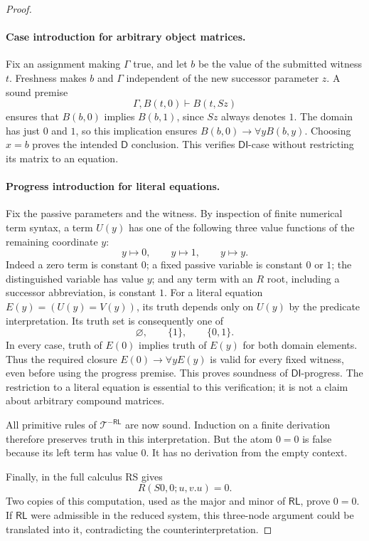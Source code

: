 \documentclass[11pt,letterpaper]{article}
\theoremstyle{definition}\newtheorem{definition}[theorem]{Definition}
\theoremstyle{remark}\newtheorem{remark}[theorem]{Remark}
\begin{document}
\begin{proof}
\paragraph{Case introduction for arbitrary object matrices.}
Fix an assignment making $\Gamma$ true, and let $b$ be the value of
the submitted witness $t$. Freshness makes $b$ and $\Gamma$
independent of the new successor parameter $z$. A sound premise
\[
        \Gamma,B(t,0)\vdash B(t,Sz)
\]
ensures that $B(b,0)$ implies $B(b,1)$, since $Sz$ always denotes
$1$. The domain has just $0$ and $1$, so this implication ensures
$B(b,0)\to\forall yB(b,y)$. Choosing $x=b$ proves the intended
$\mathsf D$ conclusion. This verifies $\mathsf{DI}$-case without
restricting its matrix to an equation.

\paragraph{Progress introduction for literal equations.}
Fix the passive parameters and the witness. By inspection of finite
numerical term syntax, a term $U(y)$ has one of the following three
value functions of the remaining coordinate $y$:
\[
                y\longmapsto0,\qquad
                y\longmapsto1,\qquad
                y\longmapsto y.
\]
Indeed a zero term is constant $0$; a fixed passive variable is constant
$0$ or $1$; the distinguished variable has value $y$; and any term
with an $R$ root, including a successor abbreviation, is constant $1$.
For a literal equation $E(y)=(U(y)=V(y))$, its truth depends only on
$U(y)$ by the predicate interpretation. Its truth set is consequently
one of
\[
                       \varnothing,\qquad\{1\},\qquad\{0,1\}.
\]
In every case, truth of $E(0)$ implies truth of $E(y)$ for both domain
elements. Thus the required closure
$E(0)\to\forall yE(y)$ is valid for every fixed witness, even before
using the progress premise. This proves soundness of
$\mathsf{DI}$-progress. The restriction to a literal equation is
essential to this verification; it is not a claim about arbitrary
compound matrices.

All primitive rules of $\mathcal T^{-\mathsf{RL}}$ are now sound.
Induction on a finite derivation therefore preserves truth in this
interpretation. But the atom $0=0$ is false because its left term has
value $0$. It has no derivation from the empty context.

Finally, in the full calculus RS gives
\[
                  R(S0,0;u,v.u)=0.
\]
Two copies of this computation, used as the major and minor of
$\mathsf{RL}$, prove $0=0$. If $\mathsf{RL}$ were admissible in
the reduced system, this three-node argument could be translated into
it, contradicting the counterinterpretation.
\end{proof}
\end{document}
